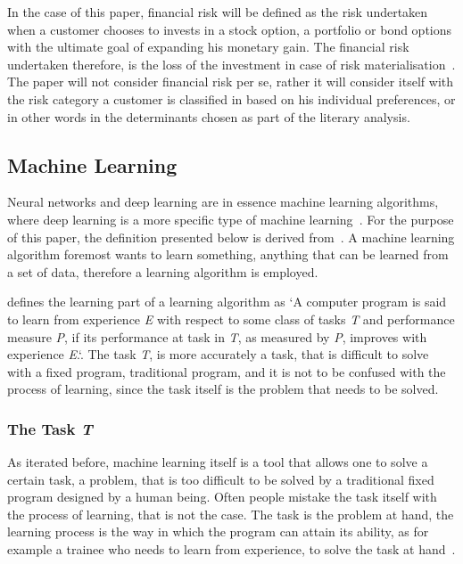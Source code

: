 \documentclass[12pt]{article}
\begin{document}
In the case of this paper, financial risk will be defined as the risk undertaken when a customer chooses to invests in a stock option, a portfolio or bond options with the ultimate goal of expanding his monetary gain. The financial risk undertaken therefore, is the loss of the investment in case of risk materialisation~\cite{finRisk}. The paper will not consider financial risk per se, rather it will consider itself with the risk category a customer is classified in based on his individual preferences, or in other words in the determinants chosen as part of the literary analysis.

\subsection{Machine Learning}
\label{sub:neural_networks}

Neural networks and deep learning are in essence machine learning algorithms, where deep learning is a more specific type of machine learning~\cite{deeplearningbook}. For the purpose of this paper, the definition presented below is derived from~\cite{deeplearningbook}. A machine learning algorithm foremost wants to learn something, anything that can be learned from a set of data, therefore a learning algorithm is employed.

\cite{mitchel97} defines the learning part of a learning algorithm as `A computer program is said to learn from experience \textit{E} with respect to some class of tasks \textit{T} and performance measure \textit{P}, if its performance at task in \textit{T}, as measured by \textit{P}, improves with experience \textit{E}.`. The task \textit{T}, is more accurately a task, that is difficult to solve with a fixed program, traditional program, and it is not to be confused with the process of learning, since the task itself is the problem that needs to be solved.


\subsubsection{The Task \textit{T}}
\label{subsub:task}
As iterated before, machine learning itself is a tool that allows one to solve a certain task, a problem, that is too difficult to be solved by a traditional fixed program designed by a human being.  Often people mistake the task itself with the process of learning, that is not the case. The task is the problem at hand, the learning process is the way in which the program can attain its ability, as for example a trainee who needs to learn from experience, to solve the task at hand~\cite{deeplearningbook}.
\end{document}
